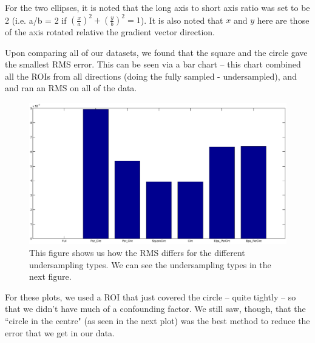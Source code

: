\documentclass[11 pt]{article}
\begin{document}
    For the two ellipses, it is noted that the long axis to short axis ratio was set to be 2 (i.e. a/b = 2 if $\left(\frac{x}{a}\right)^2 + \left(\frac{y}{b}\right)^2 = 1$). It is also noted that $x$ and $y$ here are those of the axis rotated relative the gradient vector direction.
    
    Upon comparing all of our datasets, we found that the square and the circle gave the smallest RMS error. This can be seen via a bar chart -- this chart combined all the ROIs from all directions (doing the fully sampled - undersampled), and and ran an RMS on all of the data.
    
    \begin{figure}[!h]
      \centering
      \vspace{0pt}
      \setlength\fboxsep{0pt}
      \setlength\fboxrule{0.5pt}
      \includegraphics[trim = {10mm 0mm 10mm 0mm},clip,scale = 0.4] {Figs/numericalSims/nSimRMS.eps}
      \caption{This figure shows us how the RMS differs for the different undersampling types. We can see the undersampling types in the next figure.}
      \label{fig:RMSPhant}

  \end{figure}
    
    For these plots, we used a ROI that just covered the circle -- quite tightly -- so that we didn't have much of a confounding factor. We still saw, though, that the ``circle in the centre" (as seen in the next plot) was the best method to reduce the error that we get in our data.
    
\end{document}
